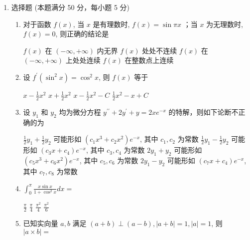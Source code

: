 
\begin{enumerate}
	\item
	选择题 (本题满分 50 分，每小题 5 分)
	\begin{enumerate}
		\item
		对于函数 $f(x)$, 当 $x$ 是有理数时, $f(x)=\sin \pi x$ ；当 $x$ 为无理数时, $f(x)=0$, 则正确的结论是  
		

\fourchoices
{$f(x)$ 在 $(-\infty,+\infty)$ 内无界}
{$f(x)$ 处处不连续}
{$f(x)$ 在 $(-\infty,+\infty)$ 上处处连续}
{$f(x)$ 在整数点上连续}

\item 
设 $f^{\prime}\left(\sin ^{2} x\right)=\cos ^{2} x$, 则 $f(x)$ 等于  


\fourchoices
{$x-\frac{1}{2} x^{2}$}
{$x+\frac{1}{2} x^{2}$}
{$x-\frac{1}{2} x^{2}-C$}
{$\frac{1}{2} x^{2}-x+C$}

\item 
设 $y_{1}$ 和 $y_{2}$ 均为微分方程 $y^{\prime \prime}+2 y^{\prime}+y=2 x e^{-x}$ 的特解，则如下论断不正确的为  


\fourchoices
{$\frac{1}{2} y_{1}+\frac{1}{2} y_{2}$ 可能形如 $\left(c_{1} x^{3}+c_{2} x^{2}\right) e^{-x}$, 其中 $c_{1}, c_{2}$ 为常数}
{$\frac{1}{2} y_{1}-\frac{1}{2} y_{2}$ 可能形如 $\left(c_{3} x+c_{4}\right) e^{-x}$, 其中 $c_{3}, c_{4}$ 为常数}
{$2 y_{1}+y_{2}$ 可能形如 $\left(c_{5} x^{3}+c_{6} x^{2}\right) e^{-x}$, 其中 $c_{5}, c_{6}$ 为常数}
{$2 y_{1}-y_{2}$ 可能形如 $\left(c_{7} x+c_{4}\right) e^{-x}$, 其中 $c_{7}, c_{8}$ 为常数}

		
\item 
$ \int_{0}^{\pi} \frac{x \sin x}{1+\cos ^{2} x} d x= $  


\fourchoices
{$\frac{\pi}{2}$}
{$\frac{\pi}{4}$}
{$\frac{\pi^{2}}{4}$}
{$\frac{\pi^{2}}{6}$}

\item 
已知实向量 $a, b$ 满足 $(a+b) \perp(a-b),|a+b|=1,|a|=1$, 则 $|a \times b|=$  



\end{enumerate}
\end{enumerate}
